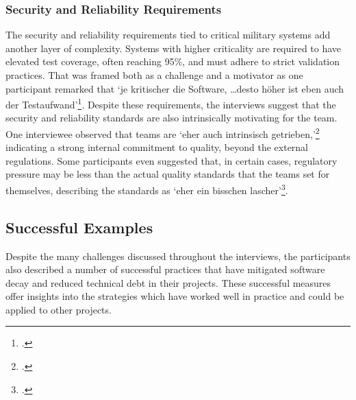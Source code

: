 \subsubsection{Security and Reliability Requirements}
The security and reliability requirements tied to critical military systems add another layer of complexity. Systems with higher criticality are required to have elevated test coverage, often reaching 95\%, and must adhere to strict validation practices. That was framed both as a challenge and a motivator
as one participant remarked that `je kritischer die Software, \ldots desto höher ist eben auch der Testaufwand'\footcite{Interview22025}.
Despite these requirements, the interviews suggest that the security and reliability standards are also intrinsically motivating for the team. One interviewee observed that teams are `eher auch intrinsisch getrieben,'\footcite{Interview32025} indicating a strong internal commitment to quality, beyond the external regulations. 
Some participants even suggested that, in certain cases, regulatory pressure may be less than the actual quality standards that the teams set for themselves, describing the standards as `eher ein bisschen lascher'\footcite{Interview32025}.

\subsection{Successful Examples}
Despite the many challenges discussed throughout the interviews, the participants also described a number of successful practices that have mitigated software decay and reduced technical debt in their projects. These successful measures offer insights into the strategies which have worked well in practice and could be applied to other projects.

